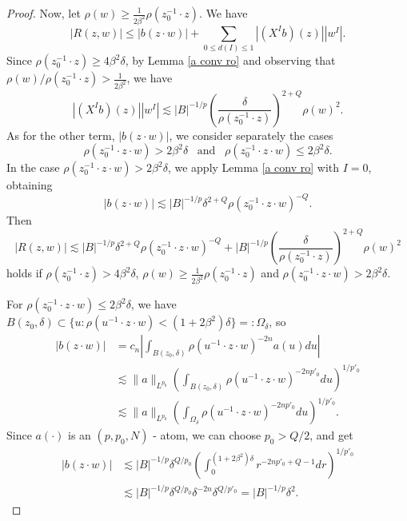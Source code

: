\documentclass[reqno,10pt]{article}
\theoremstyle{definition}
\numberwithin{equation}{section}
\numberwithin{theorem}{section}
\begin{document}
\begin{proof}
Now, let $\rho(w) \geq \frac{1}{2 \beta^2} \rho(z_0^{-1} \cdot z)$. We have
\[
|R(z, w)| \leq |b(z \cdot w)| + \sum_{0 \leq d(I) \leq 1} |(X^{I}b)(z)| |w^{I}|.
\]
Since $\rho(z_0^{-1} \cdot z) \geq 4 \beta^2 \delta$, by Lemma \ref{a conv ro} and observing that 
$\rho(w)/\rho(z_0^{-1} \cdot z) > \frac{1}{2 \beta^2}$, 
we have
\[
|(X^{I}b)(z)| |w^{I}| \lesssim |B|^{-1/p} \left( \frac{\delta}{\rho(z_0^{-1} \cdot z)} \right)^{2+Q} \rho(w)^{2}.
\]
As for the other term, $|b(z \cdot w)|$, we consider separately the cases 
\[
\rho(z_0^{-1} \cdot z \cdot w) > 2 \beta^2 \delta \,\,\,\,\, \text{and} \,\,\,\,\, \rho(z_0^{-1} \cdot z \cdot w) \leq 2 \beta^2 \delta. 
\]
In the case $\rho(z_0^{-1} \cdot z \cdot w) > 2 \beta^2 \delta$, 
we apply Lemma \ref{a conv ro} with $I = 0$, obtaining
\[
|b(z\cdot w)| \lesssim |B|^{-1/p} \delta^{2+Q} \rho(z_0^{-1} \cdot z \cdot w)^{-Q}.
\]
Then
\begin{equation} \label{R2}
|R(z,w)| \lesssim |B|^{-1/p} \delta^{2+Q} \rho(z_0^{-1} \cdot z \cdot w)^{-Q} + 
|B|^{-1/p} \left( \frac{\delta}{\rho(z_0^{-1} \cdot z)} \right)^{2+Q} \rho(w)^{2}
\end{equation}
holds if $\rho(z_0^{-1} \cdot z) > 4 \beta^2 \delta$, $\rho(w) \geq \frac{1}{2 \beta^2} \rho(z_0^{-1} \cdot z)$ and 
$\rho(z_0^{-1} \cdot z \cdot w) > 2 \beta^2 \delta$.

For $\rho(z_0^{-1} \cdot z \cdot w) \leq 2 \beta^2 \delta$, we have 
$B(z_0, \delta) \subset \{ u : \rho(u^{-1} \cdot z \cdot w) < (1+2 \beta^2) \delta \} =: \Omega_{\delta}$, so
\begin{equation*}
\begin{split}
|b(z\cdot w)| & = c_n \left| \int_{B(z_0, \delta)} \rho(u^{-1} \cdot z \cdot w)^{-2n} a(u) du \right| \\
& \lesssim \|a \|_{L^{p_0}} \left(\int_{B(z_0, \delta)} \rho(u^{-1} \cdot z \cdot w)^{-2np'_0} du \right)^{1/ p'_{0}} \\
& \lesssim \|a \|_{L^{p_0}} \left(\int_{\Omega_\delta} \rho(u^{-1} \cdot z \cdot w)^{-2np'_0} du \right)^{1/ p'_{0}}.
\end{split}
\end{equation*}
Since $a(\cdot)$ is an $(p, p_0, N)$ - atom, we can choose $p_0 > Q/2$, and get
\begin{equation*}
\begin{split}
|b(z \cdot w)| & \lesssim |B|^{-1/p} \delta^{Q/p_0} \left( \int_{0}^{(1+2\beta^2)\delta}  r^{-2n p'_0 + Q -1} dr \right)^{1/p'_0} \\
& \lesssim |B|^{-1/p} \delta^{Q/p_0} \delta^{-2n} \delta^{Q/p'_0} = |B|^{-1/p} \delta^2.
\end{split}
\end{equation*}


\end{proof}
\end{document}
